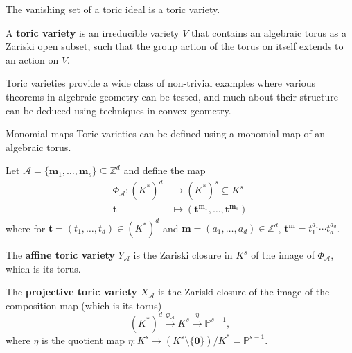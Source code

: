 \documentclass[mathserif
    , handout
   ]{beamer}
\newcommand{\vect}[1]{\mathbf#1}
\newcommand{\Z}{\mathbb Z}
\newcommand{\Prj}{\mathbb P}
\theoremstyle{plain}
\theoremstyle{definition}
\theoremstyle{remark}
\begin{document}
\begin{frame}
The vanishing set of a toric ideal is a toric variety.     

\pause
\vspace{0.75pc}
A \textbf{toric variety} is an irreducible variety $V$ that contains an algebraic torus %
as a Zariski open subset, such that the group action of the torus on itself extends to an action on $V$.  

\pause 
\vspace{0.75pc}
Toric varieties provide a wide class of non-trivial examples where various theorems in algebraic geometry can be tested, and much about their structure can be deduced using techniques in convex geometry.
\end{frame}


\begin{frame}{Monomial maps}
Toric varieties can be defined using a monomial map of an algebraic torus.

\pause 
\vspace{0.75pc}
Let $\mathscr A=\{\vect m_1,\dots,\vect m_s\}\subseteq \Z^d$ and define the map
\begin{align*}
\Phi_{\mathscr A}: (K^*)^d &\to (K^*)^s\subseteq K^s \\
\vect t &\mapsto (\vect t^{\vect m_1},\dots,\vect t^{\vect m_s})
\end{align*}
where for $\vect t=(t_1,\dots,t_d)\in (K^*)^d$ and $\vect m=(a_1,\dots,a_d)\in \Z^d$, $\vect t^{\vect m}=t_1^{a_1}\cdots t_d^{a_d}$.
\end{frame}

\begin{frame}
The \textbf{affine toric variety} $Y_{\mathscr A}$ is the Zariski closure in $K^s$ of the image of $\Phi_{\mathscr A}$, which is its torus.

\pause
\vspace{0.75pc}
The \textbf{projective toric variety} $X_{\mathscr A}$ is the Zariski closure of the image of the composition map (which is its torus)
\[(K^\ast)^d\xrightarrow{\Phi_{\mathscr{A}}}K^s\xrightarrow{\eta}\Prj^{s-1},\]
where $\eta$ is the quotient map $\eta: K^s\to (K^s\setminus \{\vect 0\})/K^*=\Prj^{s-1}$.
\end{frame}
\end{document}
